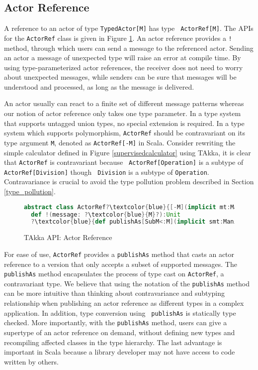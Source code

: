 \subsection{Actor Reference}
\label{actor_ref}
A reference to an actor of type {\tt TypedActor[M]} has type {\tt
ActorRef[M]}.  The APIs for the {\tt ActorRef} class is given in Figure \ref{ActorRef}. 
An actor reference provides a {\tt !} method, through which users
can send a message to the referenced actor.  Sending an actor a message of unexpected
type will raise an error at compile time. By using type-parameterized actor
references, the receiver does not need to worry about unexpected messages, while
senders can be sure that messages will be understood and processed, as long as
the message is delivered.

An actor usually can react to a finite set of different message patterns 
whereas our notion of actor reference only takes one type parameter.  In a 
type system that supports untagged union types, no special extension is
required.  In a type system which supports polymorphism, {\tt ActorRef} should
be contravariant on its type argument {\tt M}, denoted as {\tt ActorRef[-M]} in Scala.
Consider rewriting the simple calculator defined in Figure \ref{supervisedcalculator} using  
TAkka, it is clear that {\tt ActorRef} is contravariant because {\tt 
ActorRef[Operation]} is a subtype of {\tt ActorRef[Division]} though {\tt 
Division} is a subtype of {\tt Operation}. Contravariance is crucial to avoid 
the type pollution problem described in Section \ref{type_pollution}.  

\begin{figure}
\label{ActorRef}
      \begin{lstlisting}[language=scala, escapechar=?]
abstract class ActorRef?\textcolor{blue}{[-M](implicit mt:Manifest[M])}?
  def !(message: ?\textcolor{blue}{M}?):Unit
  ?\textcolor{blue}{def publishAs[SubM<:M](implicit smt:Manifest[SubM]):ActorRef[SubM]}?
    \end{lstlisting}
    \caption{TAkka API: Actor Reference}
\end{figure}

For ease of use, {\tt ActorRef} provides a {\tt publishAs} method that 
casts an actor reference to a version that only accepts a subset of supported 
messages.  The {\tt publishAs} method encapsulates the process of type cast on 
{\tt ActorRef}, a contravariant type.  We believe that using the notation of the
{\tt publishAs} method can be more intuitive than thinking about contravariance 
and subtyping relationship when publishing an actor reference as different 
types in a complex application.  In addition, type conversion using {\tt 
publishAs} is statically type checked.  More importantly, with the 
{\tt publishAs} method, users can give a supertype of an actor reference on 
demand, without defining new types and recompiling affected classes in the type 
hierarchy.  The last advantage is important in Scala because a library 
developer may not have access to code written by others.


